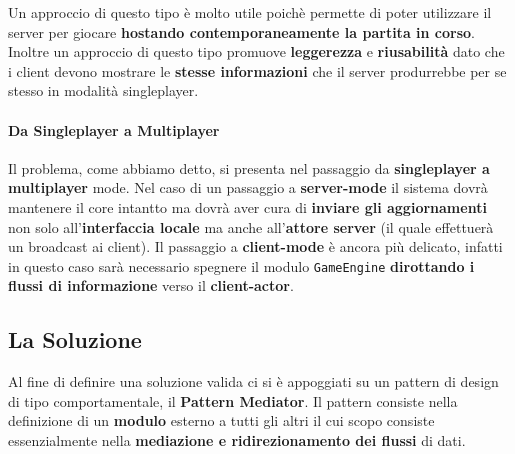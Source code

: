 Un approccio di questo tipo è molto utile poichè permette di poter utilizzare il server per giocare \textbf{hostando contemporaneamente la partita in corso}. Inoltre un approccio di questo tipo promuove \textbf{leggerezza} e \textbf{riusabilità} dato che i client devono mostrare le \textbf{stesse informazioni} che il server produrrebbe per se stesso in modalità singleplayer.

\paragraph{Da Singleplayer a Multiplayer}
Il problema, come abbiamo detto, si presenta nel passaggio da \textbf{singleplayer a multiplayer} mode. Nel caso di un passaggio a \textbf{server-mode} il sistema dovrà mantenere il core intantto ma dovrà aver cura di \textbf{inviare gli aggiornamenti} non solo all'\textbf{interfaccia locale} ma anche all'\textbf{attore server} (il quale effettuerà un broadcast ai client). Il passaggio a \textbf{client-mode} è ancora più delicato, infatti in questo caso sarà necessario spegnere il modulo \texttt{GameEngine} \textbf{dirottando i flussi di informazione} verso il \textbf{client-actor}.

\subsection{La Soluzione}
Al fine di definire una soluzione valida ci si è appoggiati su un pattern di design di tipo comportamentale, il \textbf{Pattern Mediator}. Il pattern consiste nella definizione di un \textbf{modulo} esterno a tutti gli altri il cui scopo consiste essenzialmente nella \textbf{mediazione e ridirezionamento dei flussi} di dati.

